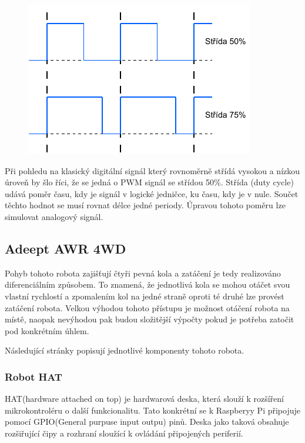 \begin{figure}[h!]
	\centering
	\includegraphics[scale=1]{obrazky-figures/pwm_duty_cycle.pdf}
	\caption{}
	\label{}
\end{figure}

Při pohledu na klasický digitální signál který rovnoměrně střídá vysokou a nízkou úroveň by šlo říci, že se jedná o PWM signál se střídou 50\%. Střída (duty cycle) udává poměr času, kdy je signál v logické jedničce, ku času, kdy je v nule. Součet těchto hodnot se musí rovnat délce jedné periody. Úpravou tohoto poměru lze simulovat analogový signál.

\subsection*{Adeept AWR 4WD}
Pohyb tohoto robota zajišťují čtyři pevná kola a zatáčení je tedy realizováno diferenciálním způsobem. To znamená, že jednotlivá kola se mohou otáčet svou vlastní rychlostí a zpomalením kol na jedné straně oproti té druhé lze provést zatáčení robota. Velkou výhodou tohoto přístupu je možnost otáčení robota na místě, naopak nevýhodou pak budou složitější výpočty pokud je potřeba zatočit pod konkrétním úhlem.

\noindent Následující stránky popisují jednotlivé komponenty tohoto robota.

\subsubsection*{Robot HAT}
HAT(hardware attached on top) je hardwarová deska, která slouží k rozšíření mikrokontroléru o další funkcionalitu. Tato konkrétní se k Raspberyy Pi připojuje pomocí GPIO(General purpuse input outpu) pinů. Deska jako taková obsahuje rozšiřující čipy a rozhraní sloužící k ovládání připojených periferií.

